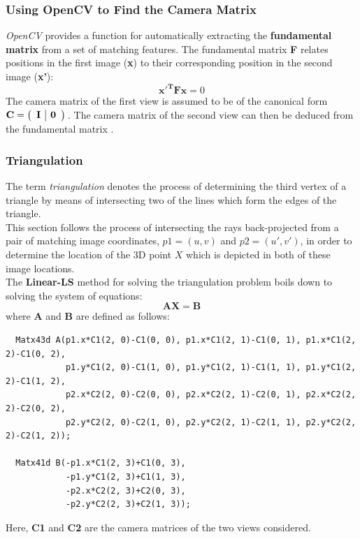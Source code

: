 \documentclass[12pt,a4paper,twoside,openright]{report}
\begin{document}
\subsubsection{Using OpenCV to Find the Camera Matrix}
\emph{OpenCV} provides a function for automatically extracting the \textbf{fundamental matrix} from a set of matching features. The fundamental matrix \textbf{F} relates positions in the first image (\textbf{x}) to their corresponding position in the second image (\textbf{x'}):
\begin{equation}
\mathbf{x'^TFx} = 0
\end{equation}
The camera matrix of the first view is assumed to be of the canonical form $\mathbf{C}=\left ( \begin{array} {c|c} \mathbf{I} & \mathbf{0} \end{array} \right )\\ $. The camera matrix of the second view can then be deduced from the fundamental matrix \cite[p.~129]{baggio2012mastering}. 

\subsubsection{Triangulation}
The term \emph{triangulation} denotes the process of determining the third vertex of a triangle by means of intersecting two of the lines which form the edges of the triangle.\\
This section follows the process of intersecting the rays back-projected from a pair of matching image coordinates, $p1=(u, v)$ and $p2=(u', v')$, in order to determine the location of the 3D point $X$ which is depicted in both of these image locations.\\
\linebreak
The \textbf{Linear-LS}\cite[p.~8]{Hartley96triangulation} method for solving the triangulation problem boils down to solving the system of equations:
\begin{equation}
\mathbf{AX} = \mathbf{B} 
\end{equation}
where \textbf{A} and \textbf{B} are defined as follows:
\begin{verbatim}
  Matx43d A(p1.x*C1(2, 0)-C1(0, 0), p1.x*C1(2, 1)-C1(0, 1), p1.x*C1(2, 2)-C1(0, 2),
            p1.y*C1(2, 0)-C1(1, 0), p1.y*C1(2, 1)-C1(1, 1), p1.y*C1(2, 2)-C1(1, 2),
            p2.x*C2(2, 0)-C2(0, 0), p2.x*C2(2, 1)-C2(0, 1), p2.x*C2(2, 2)-C2(0, 2),
            p2.y*C2(2, 0)-C2(1, 0), p2.y*C2(2, 1)-C2(1, 1), p2.y*C2(2, 2)-C2(1, 2));

  Matx41d B(-p1.x*C1(2, 3)+C1(0, 3),
            -p1.y*C1(2, 3)+C1(1, 3),
            -p2.x*C2(2, 3)+C2(0, 3),
            -p2.y*C2(2, 3)+C2(1, 3));
\end{verbatim}
Here, \textbf{C1} and \textbf{C2} are the camera matrices of the two views considered.
\end{document}
